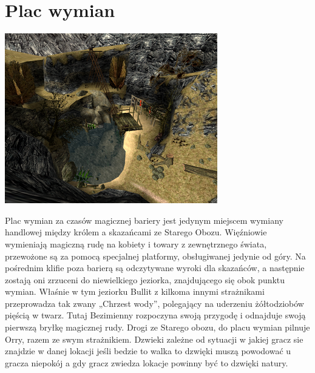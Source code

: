 \documentclass[11pt,polish, openany]{book}
\begin{document}
\section{Plac wymian}
\begin{center}
 \includegraphics[scale=0.8]{placwymian.png}
\end{center}
Plac wymian za czasów magicznej bariery jest jedynym miejscem wymiany handlowej między królem a skazańcami ze Starego Obozu. Więźniowie wymieniają magiczną rudę na kobiety i towary z zewnętrznego świata, przewożone są za pomocą specjalnej platformy, obsługiwanej jedynie od góry. Na pośrednim klifie poza barierą są odczytywane wyroki dla skazańców, a następnie zostają oni zrzuceni do niewielkiego jeziorka, znajdującego się obok punktu wymian. Właśnie w tym jeziorku Bullit z kilkoma innymi strażnikami przeprowadza tak zwany „Chrzest wody”, polegający na uderzeniu żółtodziobów pięścią w twarz. Tutaj Bezimienny rozpoczyna swoją przygodę i odnajduje swoją pierwszą bryłkę magicznej rudy. Drogi ze Starego obozu, do placu wymian pilnuje Orry, razem ze swym strażnikiem.
Dzwieki zależne od sytuacji w jakiej gracz sie znajdzie w danej lokacji jeśli bedzie to walka to dzwięki muszą powodować u gracza niepokój a gdy gracz zwiedza lokacje powinny być to dzwięki natury.
\end{document}
